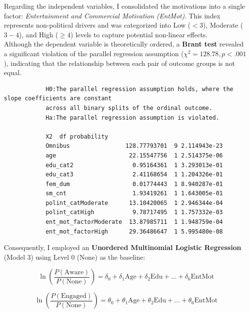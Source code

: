 \documentclass[12pt, a4paper]{article}
\begin{document}
	Regarding the independent variables, I consolidated the motivations into a single factor: \textit{Entertainment and Commercial Motivation (EntMot)}. This index represents non-political drivers and was categorized into Low ($<3$), Moderate ($3-4$), and High ($\geq4$) levels to capture potential non-linear effects.\\
	
	
	
	Although the dependent variable is theoretically ordered, a \textbf{Brant test} revealed a significant violation of the parallel regression assumption ($\chi^2 = 128.78, p < .001$), indicating that the relationship between each pair of outcome groups is not equal.
	
	
	
	{\footnotesize
		\begin{verbatim}
			H0:The parallel regression assumption holds, where the slope coefficients are constant 
			across all binary splits of the ordinal outcome.
			Ha:The parallel regression assumption is violated.
			
			X2  df probability
			Omnibus                128.77793701  9 2.114943e-23
			age                     22.15547756  1 2.514375e-06
			edu_cat2                 0.95164361  1 3.293013e-01
			edu_cat3                 2.41168654  1 1.204326e-01
			fem_dum                  0.01774443  1 8.940287e-01
			sm_cnt                   1.93419261  1 1.643005e-01
			polint_catModerate      13.10420065  1 2.946344e-04
			polint_catHigh           9.78717495  1 1.757332e-03
			ent_mot_factorModerate  13.87985711  1 1.948759e-04
			ent_mot_factorHigh      29.36486647  1 5.995480e-08
	\end{verbatim}}
	
	Consequently, I employed an \textbf{Unordered Multinomial Logistic Regression} (Model 3) using Level 0 (None) as the baseline:
	
	\begin{equation}
		\ln\left(\frac{P(\text{Aware})}{P(\text{None})}\right) = \delta_0 + \delta_1 \text{Age} + \delta_2 \text{Edu} + \dots + \delta_6 \text{EntMot}
	\end{equation}
	
	\begin{equation}
		\ln\left(\frac{P(\text{Engaged})}{P(\text{None})}\right) = \theta_0 + \theta_1 \text{Age} + \theta_2 \text{Edu} + \dots + \theta_6 \text{EntMot}
	\end{equation}
	
\end{document}
